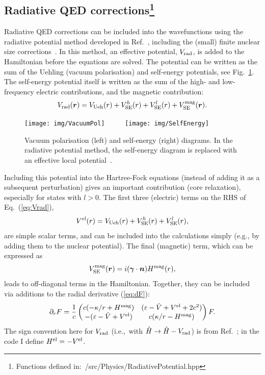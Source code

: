 \documentclass[10pt,twocolumn,a4paper]{article}%
\newcommand{\matr}[4]{\ensuremath{\begin{pmatrix}#1&#2\\#3&#4\end{pmatrix}}}	%
\renewcommand{\v}[1]{\ensuremath{\boldsymbol{#1}}}		%
\newcommand{\be}{\begin{equation}}
\newcommand{\ee}{\end{equation}}
\def\en{\ensuremath{\varepsilon}}
\def\p{\ensuremath{\partial}}
\renewcommand{\k}{\ensuremath{\kappa}}
\begin{document}
\subsection[Radiative QED corrections]{Radiative QED corrections\footnote{Functions defined in:~/src/Physics/RadiativePotential.hpp}}

Radiative QED corrections can be included into the wavefunctions using the radiative potential method developed in Ref.~\cite{FlambaumQED2005}, including the (small) finite nuclear size corrections~\cite{GingesQED2015,Ginges2016}.
In this method, an effective potential, $V_{\rm rad}$,
is added to the Hamiltonian before the equations are solved.
The potential can be written as the sum of the Uehling (vacuum polarisation) and self-energy potentials, see Fig.~\ref{fig:QED}.
The self-energy potential itself is written as the sum of the high- and low-frequency electric contributions, and the magnetic contribution:
\be\label{eq:Vrad}
V_{\rm rad}(\v{r}) = V_{\rm Ueh}(r) + V_{\rm SE}^{h}(r) +  V_{\rm SE}^{l}(r) + V_{\rm SE}^{\rm mag}(\v{r}).
\ee



\begin{figure}%
\centering\tiny
\texttt{[image: img/VacuumPol]}~~~~~
\texttt{[image: img/SelfEnergy]}
\caption{\small Vacuum polarisation (left) and self-energy (right) diagrams. In the radiative potential method, the self-energy diagram is replaced with an effective local potential~\cite{FlambaumQED2005}.\label{fig:QED}}
\end{figure}






Including this potential into the Hartree-Fock equations (instead of adding it as a subsequent perturbation) gives an important contribution (core relaxation), especially for states with $l>0$.
The first three (electric) terms on the RHS of Eq.~(\ref{eq:Vrad}),
\be
V^{\rm el}(r) =  V_{\rm Ueh}(r) +V_{\rm SE}^{h}(r) + V_{\rm SE}^{l}(r) ,
\ee
are simple scalar terms, and can be included into the calculations simply (e.g., by adding them to the nuclear potential).
The final (magnetic) term, which can be expressed as~\cite{Ginges2016}
\be
V_{\rm SE}^{\rm mag}(\v{r}) = i (\v{\gamma}\cdot\v{n}) H^{\rm mag}(r),
\ee
leads to off-diagonal terms in the Hamiltonian.
Together, they can be included via additions to the radial derivative (\ref{eq:dF}):
\be\label{eq:dF-Hmag}
\p_r F  =\frac{1}{c} \matr 	{c(-{\k}/{r} + H^{\rm mag})} 	{(\en - \hat V + V^{\rm el} + 2c^2)}  {-(\en - \hat V+ V^{\rm el} )} 	 {c({\k}/{r} - H^{\rm mag})}F.
\ee
The sign convention here for $V_{\rm rad}$ (i.e.,\ with $\hat H \to \hat H -V_{\rm rad}$) is from Ref.~\cite{FlambaumQED2005}; in the code I define $H^{\rm el}=-V^{\rm el}$.
%
\end{document}
